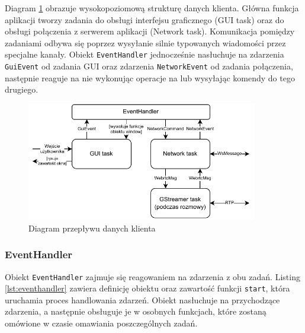 Diagram \ref{fig:client_data_flow} obrazuje wysokopoziomową strukturę danych klienta. Główna funkcja
aplikacji tworzy zadania do obsługi interfejsu graficznego (GUI task) oraz do obsługi połączenia z
serwerem aplikacji (Network task). Komunikacja pomiędzy zadaniami odbywa się poprzez wysyłanie
silnie typowanych wiadomości przez specjalne kanały. Obiekt \verb|EventHandler| jednocześnie
nasłuchuje na zdarzenia \verb|GuiEvent| od zadania GUI oraz zdarzenia \verb|NetworkEvent| od zadania
połączenia, następnie reaguje na nie wykonując operacje na lub wysyłając komendy do tego drugiego.

\begin{figure}[H]
    \centering
    \includegraphics[width=0.9\textwidth]{img/implementacja/client_data_flow}
    \caption{Diagram przepływu danych klienta}
    \label{fig:client_data_flow}
\end{figure}

\subsubsection{EventHandler}

Obiekt \verb|EventHandler| zajmuje się reagowaniem na zdarzenia z obu zadań. Listing
\ref{lst:eventhandler} zawiera definicję obiektu oraz zawartość funkcji \verb|start|, która
uruchamia proces handlowania zdarzeń. Obiekt nasłuchuje na przychodzące zdarzenia, a następnie
obsługuje je w osobnych funkcjach, które zostaną omówione w czasie omawiania poszczególnych zadań.

